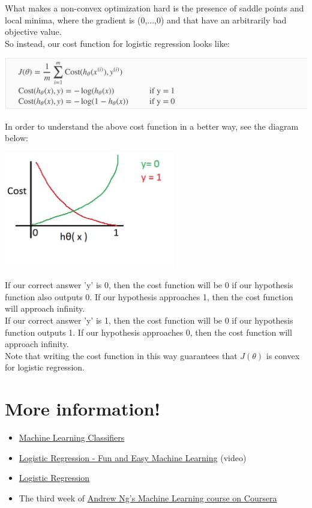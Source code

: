 \documentclass{42-en}
\begin{document}
What makes a non-convex optimization hard is the presence of saddle points and local minima, where the gradient is (0,...,0) and that have an arbitrarily bad objective value.\\

So instead, our cost function for logistic regression looks like:\\

\centerline{\includegraphics[width=150mm]{images/const_fun_log.png}}

In order to understand the above cost function in a better way, see the diagram below:\\

\centerline{\includegraphics[width=75mm]{images/cost_draw.png}}

If our correct answer 'y' is 0, then the cost function will be 0 if our hypothesis function also outputs 0. If our hypothesis approaches 1, then the cost function will approach infinity.\\

If our correct answer 'y' is 1, then the cost function will be 0 if our hypothesis function outputs 1. If our hypothesis approaches 0, then the cost function will approach infinity.\\

Note that writing the cost function in this way guarantees that \(J(\theta)\) is convex for logistic regression.\\

\section*{More information!}
\begin{itemize}
    \item \href{https://towardsdatascience.com/machine-learning-classifiers-a5cc4e1b0623}{Machine Learning Classifiers}
    \item \href{https://www.youtube.com/watch?v=7qJ7GksOXoA}{Logistic Regression - Fun and Easy Machine Learning} (video)
    \item \href{https://medium.com/greyatom/logistic-regression-89e496433063}{Logistic Regression}
    \item The third week of \href{https://www.coursera.org/learn/machine-learning}{Andrew Ng’s Machine Learning course on Coursera}
\end{itemize}
\end{document}
